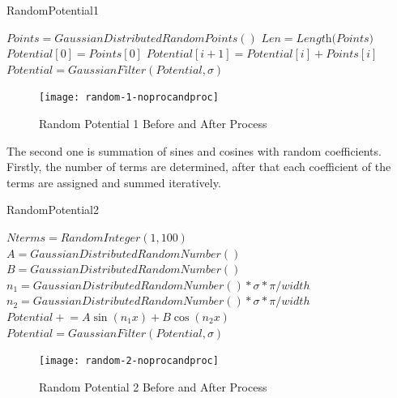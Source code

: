 \documentclass[a4paper,times,hidelinks,12pt]{article}
\begin{document}
\begin{algorithm}[H]
    \caption{RandomPotential1}\label{euclid}
    \begin{algorithmic}[1]
        \State $ Points = GaussianDistributedRandomPoints()$
        \State $Len = \textit{Length(Points)}$
        \State $Potential[0] = Points[0]$
        \State $Potential[i + 1] = Potential[i] + Points[i]$
        \EndFor
        \State $Potential = GaussianFilter(Potential, \sigma)$ 
    \EndProcedure
    \end{algorithmic}
\label{alg:random_potential_1}
\end{algorithm}

\graphicspath{{"../figs/potentials/"}}
\begin{figure}[H]
    \centering
        \texttt{[image: random-1-noprocandproc]}
\caption{Random Potential 1 Before and After Process}
\label{fig:random1_before_after}
\end{figure}



The second one is summation of sines and cosines with random coefficients. Firstly, the number of terms are determined, after that each coefficient of the terms are assigned and summed iteratively.

\begin{algorithm}[H]
    \caption{RandomPotential2}\label{euclid}
    \begin{algorithmic}[1]
        \State $ Nterms = RandomInteger(1, 100)$
        \State $A = GaussianDistributedRandomNumber()$
        \State $B = GaussianDistributedRandomNumber()$
        \State $n_1 = GaussianDistributedRandomNumber() * \sigma*\pi / width  $
        \State $n_2 = GaussianDistributedRandomNumber() * \sigma*\pi / width  $
        \State $Potential \mathrel{+}= A\sin(n_1 x) + B\cos(n_2 x)$
        \EndFor
        \State $Potential = GaussianFilter(Potential, \sigma)$ 
    \EndProcedure
    \end{algorithmic}
\label{alg:random_potential_1}
\end{algorithm}

\graphicspath{{"../figs/potentials/"}}
\begin{figure}[H]
    \centering
        \texttt{[image: random-2-noprocandproc]}
\caption{Random Potential 2 Before and After Process}
\label{fig:random2_before_after}
\end{figure}
\end{document}
